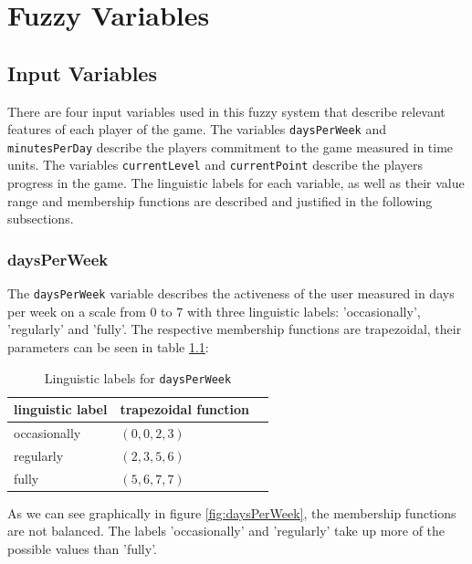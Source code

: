 \chapter{Fuzzy Variables}

\section{Input Variables}

There are four input variables used in this fuzzy system that describe relevant features of each player of the game. The variables \texttt{daysPerWeek} and \texttt{minutesPerDay} describe the players commitment to the game measured in time units. The variables \texttt{currentLevel} and \texttt{currentPoint} describe the players progress in the game. The linguistic labels for each variable, as well as their value range and membership functions are described and justified in the following subsections. 

\subsection{daysPerWeek}

The \texttt{daysPerWeek} variable describes the activeness of the user measured in days per week on a scale from 0 to 7 with three linguistic labels: 'occasionally', 'regularly' and 'fully'. The respective membership functions are trapezoidal, their parameters can be seen in table \ref{tab:daysPerWeek}:

\begin{table}[H]
\centering
\begin{tabular}{@{}lll@{}}
\toprule
\textbf{linguistic label}  & \textbf{trapezoidal function} \\ 
\midrule
occasionally  & $(0,0,2,3)$ \\
regularly & $(2,3,5,6)$ \\
fully & $(5,6,7,7)$ \\
\bottomrule
\end{tabular}
\caption{Linguistic labels for \texttt{daysPerWeek}}
\label{tab:daysPerWeek}
\end{table}

As we can see graphically in figure \ref{fig:daysPerWeek}, the membership functions are not balanced. The labels 'occasionally' and 'regularly' take up more of the possible values than 'fully'.

